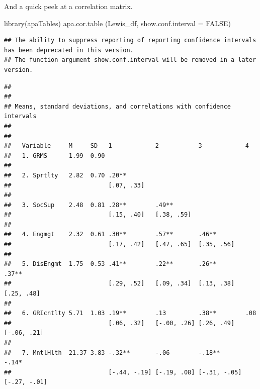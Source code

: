 \documentclass[
  english,
]{book}
\newenvironment{Shaded}{\begin{snugshade}}{\end{snugshade}}
\newcommand{\AttributeTok}[1]{\textcolor[rgb]{0.77,0.63,0.00}{#1}}
\newcommand{\ConstantTok}[1]{\textcolor[rgb]{0.00,0.00,0.00}{#1}}
\newcommand{\FunctionTok}[1]{\textcolor[rgb]{0.00,0.00,0.00}{#1}}
\newcommand{\NormalTok}[1]{#1}
\begin{document}
And a quick peek at a correlation matrix.

\begin{Shaded}
\begin{Highlighting}[]
\FunctionTok{library}\NormalTok{(apaTables)}
\FunctionTok{apa.cor.table}\NormalTok{ (Lewis\_df, }\AttributeTok{show.conf.interval =} \ConstantTok{FALSE}\NormalTok{)}
\end{Highlighting}
\end{Shaded}

\begin{verbatim}
## The ability to suppress reporting of reporting confidence intervals has been deprecated in this version.
## The function argument show.conf.interval will be removed in a later version.
\end{verbatim}

\begin{verbatim}
## 
## 
## Means, standard deviations, and correlations with confidence intervals
##  
## 
##   Variable     M     SD   1            2           3            4           
##   1. GRMS      1.99  0.90                                                   
##                                                                             
##   2. Sprtlty   2.82  0.70 .20**                                             
##                           [.07, .33]                                        
##                                                                             
##   3. SocSup    2.48  0.81 .28**        .49**                                
##                           [.15, .40]   [.38, .59]                           
##                                                                             
##   4. Engmgt    2.32  0.61 .30**        .57**       .46**                    
##                           [.17, .42]   [.47, .65]  [.35, .56]               
##                                                                             
##   5. DisEngmt  1.75  0.53 .41**        .22**       .26**        .37**       
##                           [.29, .52]   [.09, .34]  [.13, .38]   [.25, .48]  
##                                                                             
##   6. GRIcntlty 5.71  1.03 .19**        .13         .38**        .08         
##                           [.06, .32]   [-.00, .26] [.26, .49]   [-.06, .21] 
##                                                                             
##   7. MntlHlth  21.37 3.83 -.32**       -.06        -.18**       -.14*       
##                           [-.44, -.19] [-.19, .08] [-.31, -.05] [-.27, -.01]

\end{verbatim}
\end{document}
